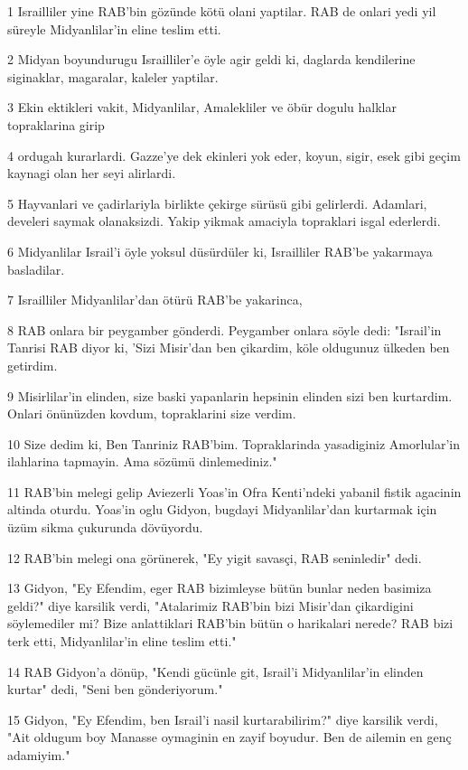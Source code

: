 \par 1 Israilliler yine RAB'bin gözünde kötü olani yaptilar. RAB de onlari yedi yil süreyle Midyanlilar'in eline teslim etti.
\par 2 Midyan boyundurugu Israilliler'e öyle agir geldi ki, daglarda kendilerine siginaklar, magaralar, kaleler yaptilar.
\par 3 Ekin ektikleri vakit, Midyanlilar, Amalekliler ve öbür dogulu halklar topraklarina girip
\par 4 ordugah kurarlardi. Gazze'ye dek ekinleri yok eder, koyun, sigir, esek gibi geçim kaynagi olan her seyi alirlardi.
\par 5 Hayvanlari ve çadirlariyla birlikte çekirge sürüsü gibi gelirlerdi. Adamlari, develeri saymak olanaksizdi. Yakip yikmak amaciyla topraklari isgal ederlerdi.
\par 6 Midyanlilar Israil'i öyle yoksul düsürdüler ki, Israilliler RAB'be yakarmaya basladilar.
\par 7 Israilliler Midyanlilar'dan ötürü RAB'be yakarinca,
\par 8 RAB onlara bir peygamber gönderdi. Peygamber onlara söyle dedi: "Israil'in Tanrisi RAB diyor ki, 'Sizi Misir'dan ben çikardim, köle oldugunuz ülkeden ben getirdim.
\par 9 Misirlilar'in elinden, size baski yapanlarin hepsinin elinden sizi ben kurtardim. Onlari önünüzden kovdum, topraklarini size verdim.
\par 10 Size dedim ki, Ben Tanriniz RAB'bim. Topraklarinda yasadiginiz Amorlular'in ilahlarina tapmayin. Ama sözümü dinlemediniz."
\par 11 RAB'bin melegi gelip Aviezerli Yoas'in Ofra Kenti'ndeki yabanil fistik agacinin altinda oturdu. Yoas'in oglu Gidyon, bugdayi Midyanlilar'dan kurtarmak için üzüm sikma çukurunda dövüyordu.
\par 12 RAB'bin melegi ona görünerek, "Ey yigit savasçi, RAB seninledir" dedi.
\par 13 Gidyon, "Ey Efendim, eger RAB bizimleyse bütün bunlar neden basimiza geldi?" diye karsilik verdi, "Atalarimiz RAB'bin bizi Misir'dan çikardigini söylemediler mi? Bize anlattiklari RAB'bin bütün o harikalari nerede? RAB bizi terk etti, Midyanlilar'in eline teslim etti."
\par 14 RAB Gidyon'a dönüp, "Kendi gücünle git, Israil'i Midyanlilar'in elinden kurtar" dedi, "Seni ben gönderiyorum."
\par 15 Gidyon, "Ey Efendim, ben Israil'i nasil kurtarabilirim?" diye karsilik verdi, "Ait oldugum boy Manasse oymaginin en zayif boyudur. Ben de ailemin en genç adamiyim."
